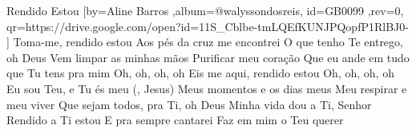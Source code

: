 \beginsong
{Rendido Estou %
}[by={Aline Barros %
},album={@walyssondosreis},
id={GB0099 %
},rev={0}, %
qr={https://drive.google.com/open?id=11S_Cblbe-tmLQEfKUNJPQopfP1RlBJ0- %
}]
\beginverse*
Toma-me, rendido estou
Aos pés da cruz me encontrei
O que tenho Te entrego, oh Deus
\endverse
\beginverse*
Vem limpar as minhas mãos
Purificar meu coração
Que eu ande em tudo que Tu tens pra mim
\endverse
\beginverse*
Oh, oh, oh, oh
Eis me aqui, rendido estou
Oh, oh, oh, oh
Eu sou Teu, e Tu és meu (, Jesus)
\endverse
\beginverse*
Meus momentos e os dias meus
Meu respirar e meu viver
Que sejam todos, pra Ti, oh Deus
\endverse
\beginchorus
Minha vida dou a Ti, Senhor
Rendido a Ti estou
E pra sempre cantarei
Faz em mim o Teu querer
\endchorus
\vspace{4em} %
\begin{comment}
\lstset{basicstyle=\scriptsize\bf} %
\tab{Solo 1}
\begin{lstlisting}
E|-----------------------------------------------------|
B|-----------------------------------------------------|
G|-----------------------------------------------------|
D|-----------------------------------------------------|
A|-----------------------------------------------------|
E|-----------------------------------------------------|
\end{lstlisting}
\end{comment}
 
